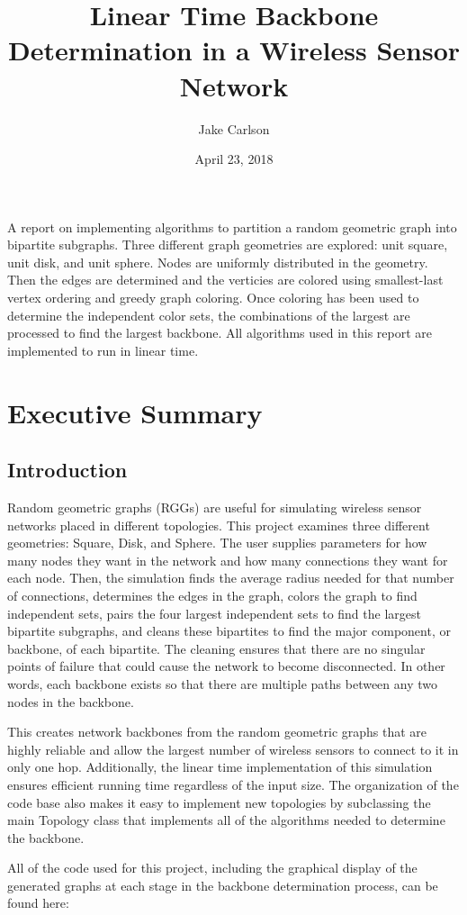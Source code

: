 \documentclass{article}
\begin{document}
\title{Linear Time Backbone Determination in a Wireless Sensor Network}
\author{Jake Carlson}
\date{April 23, 2018}
\maketitle

\abstract
A report on implementing algorithms to partition a random geometric graph into bipartite subgraphs. Three different graph geometries are explored: unit square, unit disk, and unit sphere. Nodes are uniformly distributed in the geometry. Then the edges are determined and the verticies are colored using smallest-last vertex ordering and greedy graph coloring. Once coloring has been used to determine the independent color sets, the combinations of the largest are processed to find the largest backbone. All algorithms used in this report are implemented to run in linear time.
\newpage

\tableofcontents
\lstlistoflistings
\newpage

\section{Executive Summary}

    \subsection{Introduction}
    Random geometric graphs (RGGs) are useful for simulating wireless sensor networks placed in different topologies. This project examines three different geometries: Square, Disk, and Sphere. The user supplies parameters for how many nodes they want in the network and how many connections they want for each node. Then, the simulation finds the average radius needed for that number of connections, determines the edges in the graph, colors the graph to find independent sets, pairs the four largest independent sets to find the largest bipartite subgraphs, and cleans these bipartites to find the major component, or backbone, of each bipartite. The cleaning ensures that there are no singular points of failure that could cause the network to become disconnected. In other words, each backbone exists so that there are multiple paths between any two nodes in the backbone.
    \par
    This creates network backbones from the random geometric graphs that are highly reliable and allow the largest number of wireless sensors to connect to it in only one hop. Additionally, the linear time implementation of this simulation ensures efficient running time regardless of the input size. The organization of the code base also makes it easy to implement new topologies by subclassing the main Topology class that implements all of the algorithms needed to determine the backbone.
    \par
    All of the code used for this project, including the graphical display of the generated graphs at each stage in the backbone determination process, can be found here:
\end{document}
